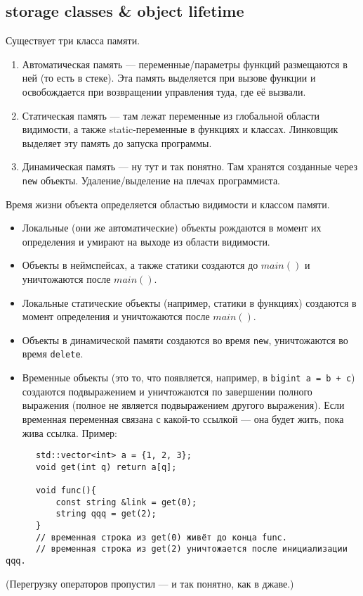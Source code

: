 \documentclass[15pt, a4paper]{article}
\newcommand{\nl}{\newline}
\begin{document}
  \subsection{storage classes \& object lifetime}
  Существует три класса памяти.
  \begin{enumerate}
      \item Автоматическая память --- переменные/параметры функций размещаются в ней (то есть в стеке). Эта память
      выделяется при вызове функции и освобождается при возвращении управления туда, где её вызвали.
      \item Статическая память --- там лежат переменные из глобальной области видимости, а также static-переменные в функциях и классах. Линковщик выделяет эту память до запуска программы.
      \item Динамическая память --- ну тут и так понятно. Там хранятся созданные через \texttt{new} объекты. Удаление/выделение на плечах программиста.
  \end{enumerate}
  Время жизни объекта определяется областью видимости и классом памяти. 
  \begin{itemize}
      \item Локальные (они же автоматические) объекты рождаются в момент их определения и умирают на выходе из области видимости.
      \item Объекты в неймспейсах, а также статики создаются до $main()$ и уничтожаются после $main()$.
      \item Локальные статические объекты (например, статики в функциях) создаются в момент определения и уничтожаются после $main()$.
      \item Объекты в динамической памяти создаются во время \texttt{new}, уничтожаются во время \texttt{delete}.
      \item Временные объекты (это то, что появляется, например, в \texttt{bigint a = b + c}) создаются подвыражением и уничтожаются по завершении полного выражения (полное не является подвыражением другого выражения).
      Если временная переменная связана с какой-то ссылкой --- она будет жить, пока жива ссылка. Пример:
  \end{itemize}
  \begin{verbatim}
      std::vector<int> a = {1, 2, 3};
      void get(int q) return a[q];

      void func(){
          const string &link = get(0);
          string qqq = get(2);
      }
      // временная строка из get(0) живёт до конца func.
      // временная строка из get(2) уничтожается после инициализации qqq.
  \end{verbatim}
  (Перегрузку операторов пропустил --- и так понятно, как в джаве.) \nl
\end{document}
